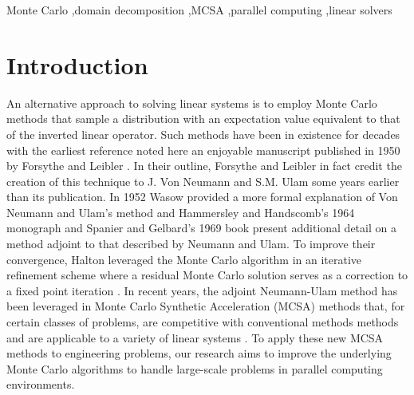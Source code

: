 \documentclass[preprint,11pt]{elsarticle}
\begin{document}
\begin{frontmatter}
  \begin{keyword}
    Monte Carlo \sep domain decomposition \sep MCSA \sep parallel computing
    \sep linear solvers
  \end{keyword}

\end{frontmatter}

\section{Introduction}
\label{sec:intro}

An alternative approach to solving linear systems is to employ Monte Carlo
methods that sample a distribution with an expectation value equivalent to
that of the inverted linear operator. Such methods have been in existence for
decades with the earliest reference noted here an enjoyable manuscript
published in 1950 by Forsythe and Leibler \cite{forsythe_matrix_1950}. In
their outline, Forsythe and Leibler in fact credit the creation of this
technique to J. Von Neumann and S.M. Ulam some years earlier than its
publication. In 1952 Wasow provided a more formal explanation of Von Neumann
and Ulam's method \cite{wasow_note_1952} and Hammersley and Handscomb's 1964
monograph \cite{hammersley_monte_1964} and Spanier and Gelbard's 1969 book
\cite{spanier_monte_1969} present additional detail on a method adjoint to
that described by Neumann and Ulam. To improve their convergence, Halton
leveraged the Monte Carlo algorithm in an iterative refinement scheme where a
residual Monte Carlo solution serves as a correction to a fixed point
iteration \cite{halton_sequential_1962}. In recent years, the adjoint
Neumann-Ulam method has been leveraged in Monte Carlo Synthetic Acceleration
(MCSA) methods that, for certain classes of problems, are competitive with
conventional methods methods and are applicable to a variety of linear systems
\cite{evans_monte_2009,evans_monte_2014}. To apply these new MCSA methods to
engineering problems, our research aims to improve the underlying Monte Carlo
algorithms to handle large-scale problems in parallel computing environments.
\end{document}
